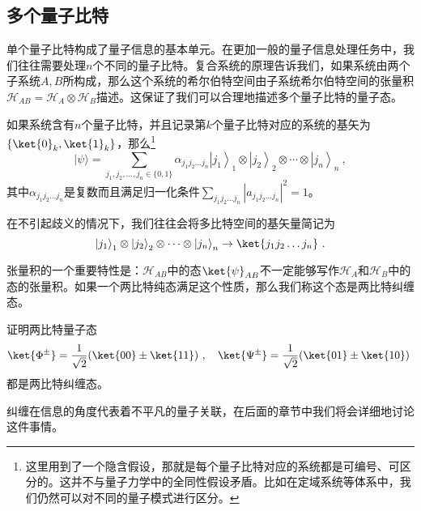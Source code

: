 \subsection{多个量子比特}


单个量子比特构成了量子信息的基本单元。在更加一般的量子信息处理任务中，我们往往需要处理$n$个不同的量子比特。复合系统的原理告诉我们，如果系统由两个子系统$A,B$所构成，那么这个系统的希尔伯特空间由子系统希尔伯特空间的张量积$\mathcal{H}_{AB}=\mathcal{H}_A\otimes\mathcal{H}_B$描述。这保证了我们可以合理地描述多个量子比特的量子态。

如果系统含有$n$个量子比特，并且记录第$k$个量子比特对应的系统的基矢为$\{\ket{0}_k,\ket{1}_k\}$，那么\footnote{这里用到了一个隐含假设，那就是每个量子比特对应的系统都是可编号、可区分的。这并不与量子力学中的全同性假设矛盾。比如在定域系统等体系中，我们仍然可以对不同的量子模式进行区分。}$$
|\psi\rangle=\sum_{j_1, j_2, \ldots, j_n \in\{0,1\}} \alpha_{j_1 j_2 \ldots j_n}\left|j_1\right\rangle_1 \otimes\left|j_2\right\rangle_2 \otimes \cdots \otimes\left|j_n\right\rangle_n~,
$$其中$\alpha_{j_1j_2\ldots j_n}$是复数而且满足归一化条件$\sum_{j_1j_2\ldots j_n}|a_{j_1j_2\ldots j_n}|^2=1$。

在不引起歧义的情况下，我们往往会将多比特空间的基矢量简记为$$\left|j_1\right\rangle_1 \otimes\left|j_2\right\rangle_2 \otimes \cdots \otimes\left|j_n\right\rangle_n\to \ket{j_1j_2\ldots j_n}~. $$

张量积的一个重要特性是：$\mathcal{H}_{AB}$中的态$\ket{\psi}_{AB}$不一定能够写作$\mathcal{H}_A$和$\mathcal{H}_B$中的态的张量积。如果一个两比特纯态满足这个性质，那么我们称这个态是两比特纠缠态。
\begin{exercise}{}
证明两比特量子态$$\ket{\Phi^{\pm}}=\frac{1}{\sqrt{2}}(\ket{00}\pm\ket{11})~,\quad \ket{\Psi^{\pm}}=\frac{1}{\sqrt{2}}(\ket{01}\pm\ket{10})~$$
都是两比特纠缠态。
\end{exercise}

纠缠在信息的角度代表着不平凡的量子关联，在后面的章节中我们将会详细地讨论这件事情。
